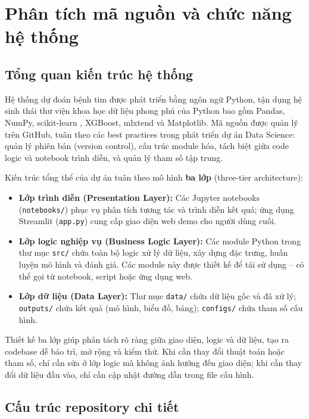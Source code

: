 \chapter{Phân tích mã nguồn và chức năng hệ thống}\label{chapter_code}

\section{Tổng quan kiến trúc hệ thống}

Hệ thống dự đoán bệnh tim được phát triển bằng ngôn ngữ Python, tận dụng hệ sinh thái thư viện khoa học dữ liệu phong phú của Python bao gồm Pandas, NumPy, scikit-learn \cite{pedregosa2011scikit}, XGBoost, mlxtend và Matplotlib. Mã nguồn được quản lý trên GitHub, tuân theo các best practices trong phát triển dự án Data Science: quản lý phiên bản (version control), cấu trúc module hóa, tách biệt giữa code logic và notebook trình diễn, và quản lý tham số tập trung.

Kiến trúc tổng thể của dự án tuân theo mô hình \textbf{ba lớp} (three-tier architecture):
\begin{itemize}
    \item \textbf{Lớp trình diễn (Presentation Layer):} Các Jupyter notebooks (\texttt{notebooks/}) phục vụ phân tích tương tác và trình diễn kết quả; ứng dụng Streamlit (\texttt{app.py}) cung cấp giao diện web demo cho người dùng cuối.
    \item \textbf{Lớp logic nghiệp vụ (Business Logic Layer):} Các module Python trong thư mục \texttt{src/} chứa toàn bộ logic xử lý dữ liệu, xây dựng đặc trưng, huấn luyện mô hình và đánh giá. Các module này được thiết kế để tái sử dụng -- có thể gọi từ notebook, script hoặc ứng dụng web.
    \item \textbf{Lớp dữ liệu (Data Layer):} Thư mục \texttt{data/} chứa dữ liệu gốc và đã xử lý; \texttt{outputs/} chứa kết quả (mô hình, biểu đồ, bảng); \texttt{configs/} chứa tham số cấu hình.
\end{itemize}

Thiết kế ba lớp giúp phân tách rõ ràng giữa giao diện, logic và dữ liệu, tạo ra codebase dễ bảo trì, mở rộng và kiểm thử. Khi cần thay đổi thuật toán hoặc tham số, chỉ cần sửa ở lớp logic mà không ảnh hưởng đến giao diện; khi cần thay đổi dữ liệu đầu vào, chỉ cần cập nhật đường dẫn trong file cấu hình.

\section{Cấu trúc repository chi tiết}

